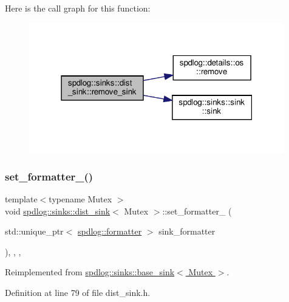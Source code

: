 Here is the call graph for this function\+:
\nopagebreak
\begin{figure}[H]
\begin{center}
\leavevmode
\includegraphics[width=315pt]{classspdlog_1_1sinks_1_1dist__sink_ac1537fdc6225fd57cc819e1fb9c5f8c7_cgraph}
\end{center}
\end{figure}
\mbox{\label{classspdlog_1_1sinks_1_1dist__sink_a5e83e285fcceaab7ee4c4736c2decef0}} 
\subsubsection{\texorpdfstring{set\+\_\+formatter\+\_\+()}{set\_formatter\_()}}
{\footnotesize\ttfamily template$<$typename Mutex $>$ \\
void \hyperlink{classspdlog_1_1sinks_1_1dist__sink}{spdlog\+::sinks\+::dist\+\_\+sink}$<$ Mutex $>$\+::set\+\_\+formatter\+\_\+ (\begin{DoxyParamCaption}\item[{std\+::unique\+\_\+ptr$<$ \hyperlink{classspdlog_1_1formatter}{spdlog\+::formatter} $>$}]{sink\+\_\+formatter }\end{DoxyParamCaption})\hspace{0.3cm}{\ttfamily [inline]}, {\ttfamily [override]}, {\ttfamily [protected]}, {\ttfamily [virtual]}}



Reimplemented from \hyperlink{classspdlog_1_1sinks_1_1base__sink_aed93aabfba62b684e603eb525671c864}{spdlog\+::sinks\+::base\+\_\+sink$<$ Mutex $>$}.



Definition at line 79 of file dist\+\_\+sink.\+h.

